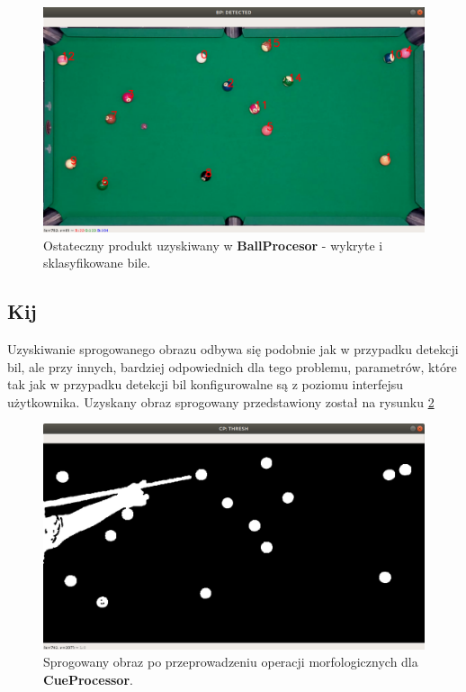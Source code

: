 \documentclass[12pt]{article}
\begin{document}
    \begin{figure}[!htb]
        \centering
        \includegraphics[width=15cm]{./images/obrazki/klasyfikacja/bp_classified.png}
        \caption{Ostateczny produkt uzyskiwany w \textbf{BallProcesor} - wykryte i sklasyfikowane bile.}
        \label{bp_classified}
    \end{figure}

\subsection{Kij}

Uzyskiwanie sprogowanego obrazu odbywa się podobnie jak w przypadku detekcji bil, ale przy innych, bardziej odpowiednich dla tego problemu, parametrów, które tak jak w przypadku detekcji bil konfigurowalne są z poziomu interfejsu użytkownika. Uzyskany obraz sprogowany przedstawiony został na rysunku \ref{cp_thresh}

\begin{figure}[!htb]
    \centering
    \includegraphics[width=15cm]{./images/obrazki/cp/cp_thresh.png}
    \caption{Sprogowany obraz po przeprowadzeniu operacji morfologicznych dla \textbf{CueProcessor}.}
    \label{cp_thresh}
\end{figure}
\end{document}
